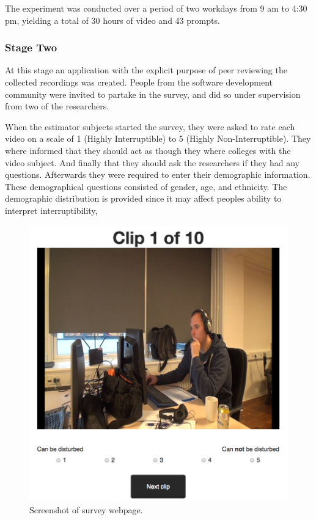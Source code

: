 \documentclass{sigchi}
\begin{document}
The experiment was conducted over a period of two workdays from 9 am to 4:30 pm, yielding a total of 30 hours of video and 43 prompts.

\subsubsection{Stage Two}
\label{stage_two}
At this stage an application with the explicit purpose of peer reviewing the collected recordings was created.
People from the software development community were invited to partake in the survey, and did so under supervision from two of the researchers.

When the estimator subjects started the survey, they were asked to rate each video on a scale of 1 (Highly Interruptible) to 5 (Highly Non-Interruptible).
They where informed that they should act as though they where colleges with the video subject.
And finally that they should ask the researchers if they had any questions.
Afterwards they were required to enter their demographic information.
These demographical questions consisted of gender, age, and ethnicity.
The demographic distribution is provided since it may affect peoples ability to interpret interruptibility,

\begin{figure}
  \centering
  \includegraphics[width=\columnwidth]{figures/webpage_screenshot.png}
  \caption{Screenshot of survey webpage.}
  \label{fig:webpage}
\end{figure}
\end{document}
